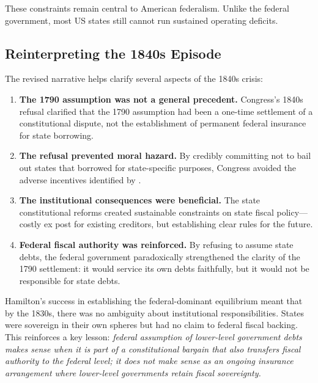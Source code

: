 \documentclass[12pt]{article}
\begin{document}
These constraints remain central to American federalism. Unlike the
federal government, most US states still cannot run sustained operating
deficits.

\subsection{Reinterpreting the 1840s Episode}

The revised narrative helps clarify several aspects of the 1840s crisis:

\begin{enumerate}
\item \textbf{The 1790 assumption was not a general precedent.}
  Congress's 1840s refusal clarified that the 1790 assumption had been a
  one-time settlement of a constitutional dispute, not the establishment
  of permanent federal insurance for state borrowing.

\item \textbf{The refusal prevented moral hazard.} By credibly
  committing not to bail out states that borrowed for state-specific
  purposes, Congress avoided the adverse incentives identified by
  \citet{KarekenWallace1978}.

\item \textbf{The institutional consequences were beneficial.} The state
  constitutional reforms created sustainable constraints on state fiscal
  policy---costly ex post for existing creditors, but establishing clear
  rules for the future.

\item \textbf{Federal fiscal authority was reinforced.} By refusing to
  assume state debts, the federal government paradoxically strengthened
  the clarity of the 1790 settlement: it would service its own debts
  faithfully, but it would not be responsible for state debts.
\end{enumerate}

Hamilton's success in establishing the federal-dominant equilibrium meant
that by the 1830s, there was no ambiguity about institutional
responsibilities. States were sovereign in their own spheres but had no
claim to federal fiscal backing. This reinforces a key lesson:
\emph{federal assumption of lower-level government debts makes sense when
it is part of a constitutional bargain that also transfers fiscal
authority to the federal level; it does not make sense as an ongoing
insurance arrangement where lower-level governments retain fiscal
sovereignty.}
\end{document}
